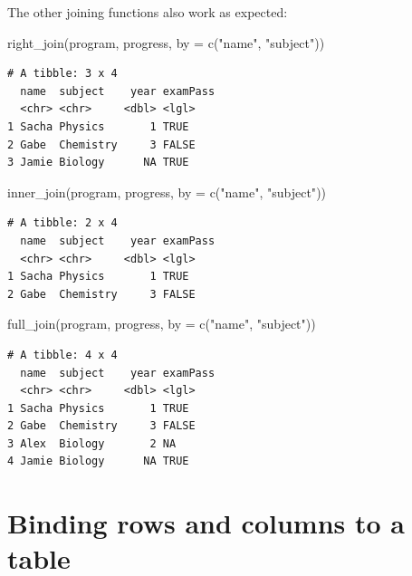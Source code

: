 \documentclass[
  letterpaper,
  DIV=11,
  numbers=noendperiod]{scrreprt}
\newenvironment{Shaded}{\begin{snugshade}}{\end{snugshade}}
\newcommand{\AttributeTok}[1]{\textcolor[rgb]{0.40,0.45,0.13}{#1}}
\newcommand{\FunctionTok}[1]{\textcolor[rgb]{0.28,0.35,0.67}{#1}}
\newcommand{\NormalTok}[1]{\textcolor[rgb]{0.00,0.23,0.31}{#1}}
\newcommand{\StringTok}[1]{\textcolor[rgb]{0.13,0.47,0.30}{#1}}
\begin{document}
The other joining functions also work as expected:

\begin{Shaded}
\begin{Highlighting}[]
\FunctionTok{right\_join}\NormalTok{(program, progress, }\AttributeTok{by =} \FunctionTok{c}\NormalTok{(}\StringTok{"name"}\NormalTok{, }\StringTok{"subject"}\NormalTok{))}
\end{Highlighting}
\end{Shaded}

\begin{verbatim}
# A tibble: 3 x 4
  name  subject    year examPass
  <chr> <chr>     <dbl> <lgl>   
1 Sacha Physics       1 TRUE    
2 Gabe  Chemistry     3 FALSE   
3 Jamie Biology      NA TRUE    
\end{verbatim}

\begin{Shaded}
\begin{Highlighting}[]
\FunctionTok{inner\_join}\NormalTok{(program, progress, }\AttributeTok{by =} \FunctionTok{c}\NormalTok{(}\StringTok{"name"}\NormalTok{, }\StringTok{"subject"}\NormalTok{))}
\end{Highlighting}
\end{Shaded}

\begin{verbatim}
# A tibble: 2 x 4
  name  subject    year examPass
  <chr> <chr>     <dbl> <lgl>   
1 Sacha Physics       1 TRUE    
2 Gabe  Chemistry     3 FALSE   
\end{verbatim}

\begin{Shaded}
\begin{Highlighting}[]
\FunctionTok{full\_join}\NormalTok{(program, progress, }\AttributeTok{by =} \FunctionTok{c}\NormalTok{(}\StringTok{"name"}\NormalTok{, }\StringTok{"subject"}\NormalTok{))}
\end{Highlighting}
\end{Shaded}

\begin{verbatim}
# A tibble: 4 x 4
  name  subject    year examPass
  <chr> <chr>     <dbl> <lgl>   
1 Sacha Physics       1 TRUE    
2 Gabe  Chemistry     3 FALSE   
3 Alex  Biology       2 NA      
4 Jamie Biology      NA TRUE    
\end{verbatim}

\hypertarget{binding-rows-and-columns-to-a-table}{%
\section{Binding rows and columns to a
table}\label{binding-rows-and-columns-to-a-table}}
\end{document}

